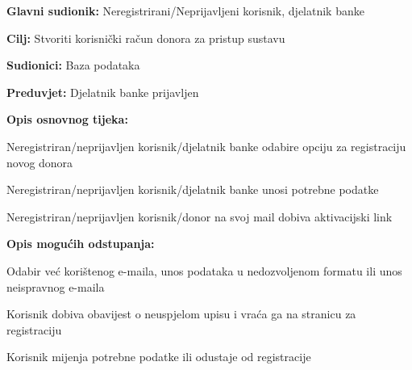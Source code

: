 \noindent {}
					\begin{packed_item}
	
						\item \textbf{Glavni sudionik: }Neregistrirani/Neprijavljeni korisnik, djelatnik banke
						\item \textbf{Cilj:} Stvoriti korisnički račun donora za pristup sustavu
						\item \textbf{Sudionici:} Baza podataka
						\item \textbf{Preduvjet:} Djelatnik banke prijavljen 
						\item \textbf{Opis osnovnog tijeka:}
						
						\item[] \begin{packed_enum}
	
							\item Neregistriran/neprijavljen korisnik/djelatnik banke odabire opciju za registraciju novog donora
							\item Neregistriran/neprijavljen korisnik/djelatnik banke unosi potrebne podatke
							\item Neregistriran/neprijavljen korisnik/donor na svoj mail dobiva aktivacijski link
							
						\end{packed_enum}
						
						\item  \textbf{Opis mogućih odstupanja:}
						
						\item[] \begin{packed_item}
	
							\item[2.a] Odabir već korištenog e-maila, unos podataka u nedozvoljenom formatu ili unos neispravnog e-maila
							\item[] \begin{packed_enum}
								
								\item Korisnik dobiva obavijest o neuspjelom upisu i vraća ga na stranicu za registraciju
								\item Korisnik mijenja potrebne podatke ili odustaje od registracije
								
							\end{packed_enum}
							
							
						\end{packed_item}
					\end{packed_item}

